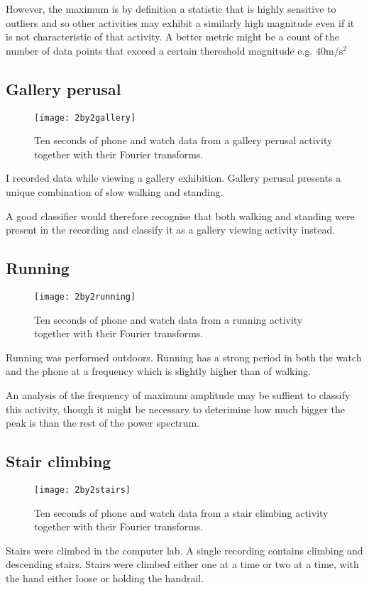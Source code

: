       However, the maximum is by definition a statistic that is highly sensitive to outliers and so other activities may exhibit a similarly high magnitude even if it is not characteristic of that activity. A better metric might be a count of the number of data points that exceed a certain thereshold magnitude e.g. $40 \si{\metre\per\square\second}$ 
    \pagebreak[4]
    \subsection{Gallery perusal}
      \begin{figure}[!th]
        \centering
        \texttt{[image: 2by2gallery]}
        \caption[Gallery perusal sample]{Ten seconds of phone and watch data from a gallery perusal activity together with their Fourier transforms.}
        \label{fig:2by2gallery}
      \end{figure}
      
      I recorded data while viewing a gallery exhibition. Gallery perusal presents a unique combination of slow walking and standing.
      
      A good classifier would therefore recognise that both walking and standing were present in the recording and classify it as a gallery viewing activity instead.
    \pagebreak[4]
    \subsection{Running}
      \begin{figure}[!th]
        \centering
        \texttt{[image: 2by2running]}
        \caption[Running sample]{Ten seconds of phone and watch data from a running activity together with their Fourier transforms.}
        \label{fig:2by2running}
      \end{figure}
      
      Running was performed outdoors. Running has a strong period in both the watch and the phone at a frequency which is slightly higher than of walking.
      
      An analysis of the frequency of maximum amplitude may be suffient to classify this activity, though it might be necessary to deterimine how much bigger the peak is than the rest of the power spectrum.
      
    \pagebreak[4]
    \subsection{Stair climbing}
      \begin{figure}[!th]
        \centering
        \texttt{[image: 2by2stairs]}
        \caption[Stair climbing sample]{Ten seconds of phone and watch data from a stair climbing activity together with their Fourier transforms.}
        \label{fig:2by2stairs}
      \end{figure}
      Stairs were climbed in the computer lab. A single recording contains climbing and descending stairs. Stairs were climbed either one at a time or two at a time, with the hand either loose or holding the handrail.
      
